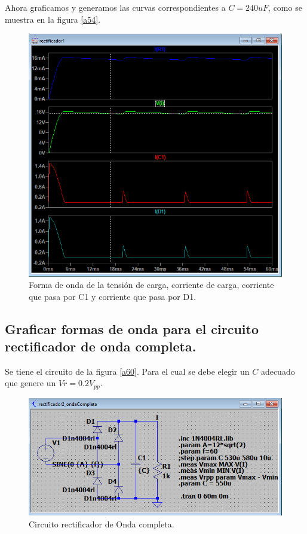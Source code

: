 \documentclass[a4paper]{IEEEtran} %
\begin{document}
Ahora graficamos y generamos las curvas correspondientes a $C=240uF$, como se muestra en la figura \eqref{a54}.

\begin{figure}[h!]
	\centering
	\includegraphics[scale=0.5]{IMAGENES/a54}
	\caption{Forma de onda de la tensión de carga, corriente de carga, corriente que pasa por C1 y corriente que pasa por D1.}
	\label{a54}
\end{figure}


\subsection{Graficar formas de onda para el circuito rectificador de onda completa.}

Se tiene el circuito de la figura \eqref{a60}. Para el cual se debe elegir un $C$ adecuado que genere un $Vr = 0.2V_{pp}$.

\begin{figure}[h!]
	\centering
	\includegraphics[scale=0.5]{IMAGENES/a60}
	\caption{Circuito rectificador de Onda completa.}
	\label{a60}
\end{figure}
\end{document}
